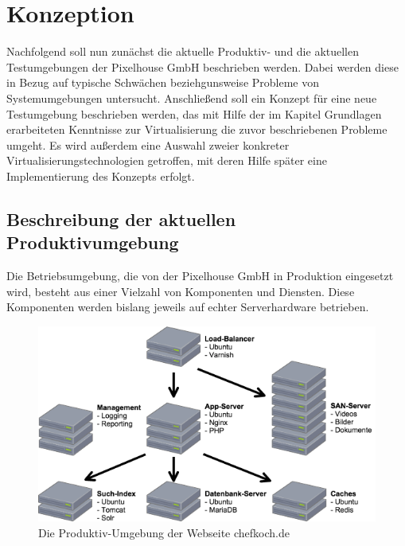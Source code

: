 \section{Konzeption}

Nachfolgend soll nun zunächst die aktuelle Produktiv- und die aktuellen Testumgebungen der Pixelhouse GmbH beschrieben werden. Dabei werden diese in Bezug auf typische Schwächen beziehgunsweise Probleme von Systemumgebungen untersucht. Anschließend soll ein Konzept für eine neue Testumgebung beschrieben werden, das mit Hilfe der im Kapitel Grundlagen erarbeiteten Kenntnisse zur Virtualisierung die zuvor beschriebenen Probleme umgeht. Es wird außerdem eine Auswahl zweier konkreter Virtualisierungstechnologien getroffen, mit deren Hilfe später eine Implementierung des Konzepts erfolgt.

\subsection{Beschreibung der aktuellen Produktivumgebung}

Die Betriebsumgebung, die von der Pixelhouse GmbH in Produktion eingesetzt wird, besteht aus einer Vielzahl von Komponenten und Diensten. Diese Komponenten werden bislang jeweils auf echter Serverhardware betrieben.

\begin{figure}[!ht]
  \begin{center}
    \includegraphics[width=14cm]{bilder/Produktiv-Umgebung.png}
    \caption{Die Produktiv-Umgebung der Webseite chefkoch.de}
  \end{center}
\end{figure}

